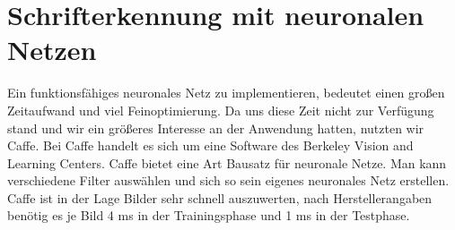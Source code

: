 \section{Schrifterkennung mit neuronalen Netzen}

Ein funktionsfähiges neuronales Netz zu implementieren, bedeutet einen großen Zeitaufwand und viel Feinoptimierung. Da uns diese Zeit nicht zur Verfügung stand und wir ein größeres Interesse an der Anwendung hatten, nutzten wir Caffe. Bei Caffe handelt es sich um eine Software des Berkeley Vision and Learning Centers. Caffe bietet eine Art Bausatz für neuronale Netze. Man kann verschiedene Filter auswählen und sich so sein eigenes neuronales Netz erstellen. Caffe ist in der Lage Bilder sehr schnell auszuwerten, nach Herstellerangaben benötig es je Bild 4 ms in der Trainingsphase und 1 ms in der Testphase.